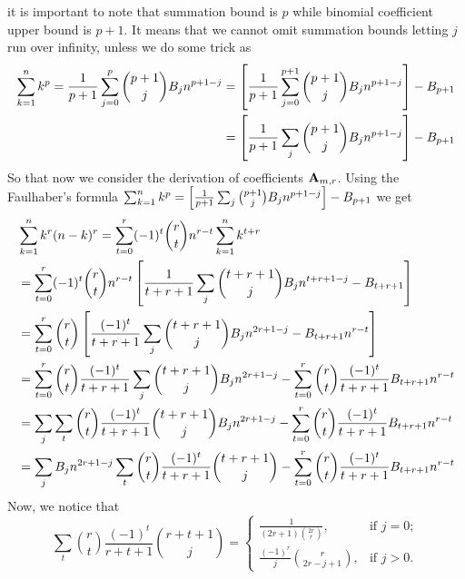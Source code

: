 it is important to note that summation bound is $p$ while binomial coefficient upper bound is $p+1$.
It means that we cannot omit summation bounds letting $j$ run over infinity, unless we do some trick as
\begin{equation*}
    \begin{split}
        \sum_{k=1}^{n} k^{p}
        = \frac{1}{p+1}\sum_{j=0}^{p} \binom{p+1}{j} {B}\sb{j} n^{p+1-j}
        &= \left[ \frac{1}{p+1}\sum_{j=0}^{p+1} \binom{p+1}{j} {B}\sb{j} n^{p+1-j} \right] - {B}\sb{p+1} \\
        &= \left[ \frac{1}{p+1}\sum_{j} \binom{p+1}{j} {B}\sb{j} n^{p+1-j} \right] - {B}\sb{p+1}
    \end{split}
\end{equation*}
So that now we consider the derivation of coefficients ${\mathbf{A}} \sb{m,r}$.
Using the Faulhaber's formula
$\sum_{k=1}^{n} k^{p} = \left[ \frac{1}{p+1}\sum_{j} \binom{p+1}{j} {B}\sb{j} n^{p+1-j} \right] - {B}\sb{p+1}$
we get
\begin{equation*}
    \begin{split}
        &\sum_{k=1}^{n} k^{r} (n-k)^{r}
        = \sum_{t=0}^{r} (-1)^t \binom{r}{t} n^{r-t} \sum_{k=1}^{n} k^{t+r} \\
        &= \sum_{t=0}^{r} (-1)^t \binom{r}{t} n^{r-t} \left[ \frac{1}{t+r+1} \sum_{j} \binom{t+r+1}{j} {B}\sb{j} n^{t+r+1-j} - {B}\sb{t+r+1} \right] \\
        &= \sum_{t=0}^{r} \binom{r}{t} \left[ \frac{(-1)^t}{t+r+1} \sum_{j} \binom{t+r+1}{j} {B}\sb{j} n^{2r+1-j} - {B}\sb{t+r+1} n^{r-t} \right] \\
        &= \sum_{t=0}^{r} \binom{r}{t} \frac{(-1)^t}{t+r+1} \sum_{j} \binom{t+r+1}{j} {B}\sb{j} n^{2r+1-j} - \sum_{t=0}^{r} \binom{r}{t} \frac{(-1)^t}{t+r+1} {B}\sb{t+r+1} n^{r-t} \\
        &= \sum_{j} \sum_{t} \binom{r}{t} \frac{(-1)^t}{t+r+1} \binom{t+r+1}{j} {B}\sb{j} n^{2r+1-j} - \sum_{t=0}^{r} \binom{r}{t} \frac{(-1)^t}{t+r+1} {B}\sb{t+r+1} n^{r-t} \\
        &= \sum_{j} {B}\sb{j} n^{2r+1-j} \sum_{t} \binom{r}{t} \frac{(-1)^t}{t+r+1} \binom{t+r+1}{j} - \sum_{t=0}^{r} \binom{r}{t} \frac{(-1)^t}{t+r+1} {B}\sb{t+r+1} n^{r-t}
    \end{split}
\end{equation*}
Now, we notice that
\begin{equation}
    \sum_{t} \binom{r}{t} \frac{(-1)^t}{r+t+1} \binom{r+t+1}{j}
    =\begin{cases}
         \frac{1}{(2r+1) \binom{2r}r}, & \text{if } j=0;\\
         \frac{(-1)^r}{j} \binom{r}{2r-j+1}, & \text{if } j>0.
    \end{cases}\label{eq:combinatorial-identity}
\end{equation}
